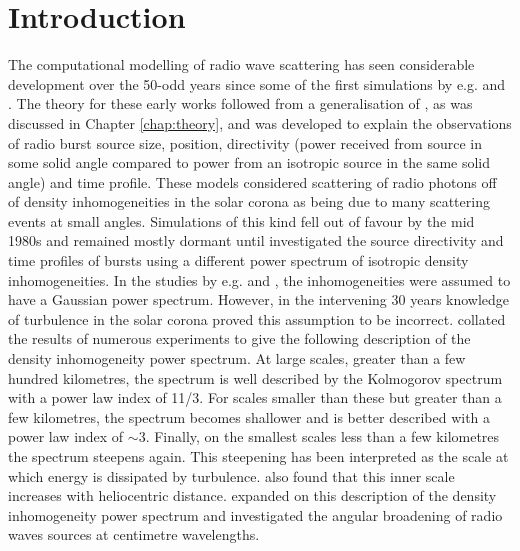 \section{Introduction}
\label{sec:obsvtheory_intro}
The computational modelling of radio wave scattering has seen considerable development over the 50-odd years since some of the first simulations by e.g. \cite{Fokker1965} and \cite{Steinberg1971}. The theory for these early works followed from a generalisation of \cite{Chandrasekhar1952}, as was discussed in Chapter \ref{chap:theory}, and was developed to explain the observations of radio burst source size, position, directivity (power received from source in some solid angle compared to power from an isotropic source in the same solid angle) and time profile. These models considered scattering of radio photons off of density inhomogeneities in the solar corona as being due to many scattering events at small angles. Simulations of this kind fell out of favour by the mid 1980s and remained mostly dormant until \cite{Thejappa2007} investigated the source directivity and time profiles of bursts using a different power spectrum of isotropic density inhomogeneities. In the studies by e.g. \cite{Fokker1965} and \cite{Steinberg1971}, the inhomogeneities were assumed to have a Gaussian power spectrum. However, in the intervening 30 years knowledge of turbulence in the solar corona proved this assumption to be incorrect. \cite{Coles1989} collated the results of numerous experiments to give the following description of the density inhomogeneity power spectrum. At large scales, greater than a few hundred kilometres, the spectrum is well described by the Kolmogorov spectrum \citep{Kolmogorov1941} with a power law index of 11/3. For scales smaller than these but greater than a few kilometres, the spectrum becomes shallower and is better described with a power law index of $\sim 3$. Finally, on the smallest scales less than a few kilometres the spectrum steepens again. This steepening has been interpreted as the scale at which energy is dissipated by turbulence. \cite{Coles1989} also found that this inner scale increases with heliocentric distance. \cite{Bastian1994} expanded on this description of the density inhomogeneity power spectrum and investigated the angular broadening of radio waves sources at centimetre wavelengths.

